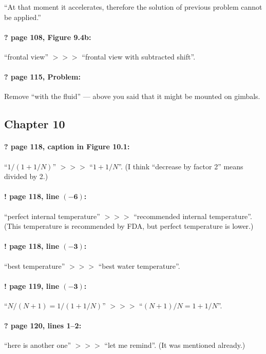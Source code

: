 \documentclass[twoside]{article}
\begin{document}
``At that moment it accelerates, therefore the solution of previous problem cannot be applied.''

\paragraph{? page 108, Figure 9.4b:} ``frontal view'' $>\!>\!>$ ``frontal view with subtracted shift''.

\paragraph{? page 115, Problem:} Remove ``with the fluid'' --- above you said that it might be mounted on gimbals.

\subsection*{Chapter 10}

\paragraph{? page 118, caption in Figure 10.1:} ``$1/(1+1/N)$'' $>\!>\!>$ ``$1+1/N$''. (I think ``decrease by factor 2'' means divided by 2.)

\paragraph{! page 118, line $\bm{(-6)}$:}  ``perfect internal temperature'' $>\!>\!>$ ``recommended internal temperature''. (This temperature is recommended by FDA, but perfect temperature is lower.)

\paragraph{! page 118, line $\bm{(-3)}$:} ``best temperature'' $>\!>\!>$ ``best water temperature''.

\paragraph{! page 119, line $\bm{(-3)}$:} ``$N/(N+1)=1/(1+1/N)$'' $>\!>\!>$ ``$(N+1)/N=1+1/N$''.

\paragraph{? page 120, lines 1--2:} ``here is another one'' $>\!>\!>$ ``let me remind''. (It was mentioned already.)
\end{document}
